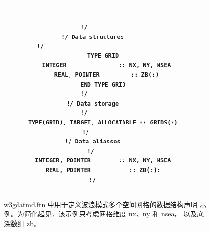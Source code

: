 \begin{figure}
\begin{center} \begin{tabular}{|c|} \hline 
\begin{minipage}[t]{4.5in}
\begin{verbatim}

!/     
!/ Data structures
!/                              
      TYPE GRID
        INTEGER               :: NX, NY, NSEA
        REAL, POINTER         :: ZB(:)
      END TYPE GRID
!/     
!/ Data storage
!/     
      TYPE(GRID), TARGET, ALLOCATABLE :: GRIDS(:)
!/    
!/ Data aliasses
!/ 
      INTEGER, POINTER        :: NX, NY, NSEA
      REAL, POINTER           :: ZB(:):
!/

\end{verbatim}
\end{minipage} \\ \hline
\end{tabular} \end{center}

\caption{{\file w3gdatmd.ftn} 中用于定义波浪模式多个空间网格的数据结构声明
示例。为简化起见，该示例只考虑网格维度 {\F nx}、{\F ny} 和 {\F nsea}，
以及底深数组 {\F zb}。}
\label{fig:struc_1}

\botline
\end{figure}
